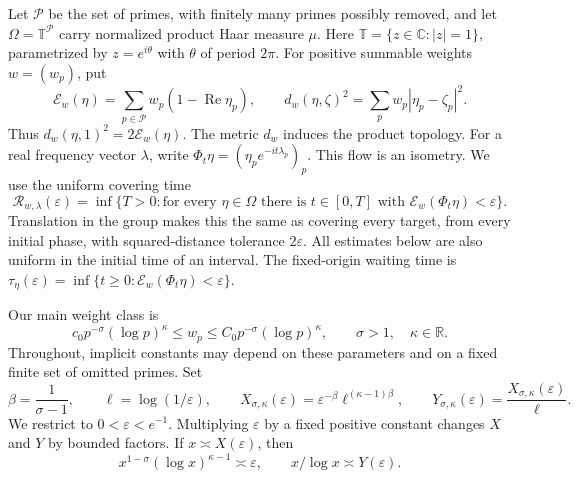 \documentclass[11pt,letterpaper]{article}
\theoremstyle{definition}
\theoremstyle{remark}
\newcommand{\T}{\mathbb T}
\newcommand{\R}{\mathbb R}
\newcommand{\C}{\mathbb C}
\newcommand{\eps}{\varepsilon}
\renewcommand{\Re}{\operatorname{Re}}
\newcommand{\1}{\mathbf 1}
\begin{document}
Let $\mathcal P$ be the set of primes, with finitely many primes possibly
removed, and let $\Omega=\T^{\mathcal P}$ carry normalized product Haar
measure $\mu$. Here $\T=\{z\in\C:|z|=1\}$, parametrized by
$z=e^{i\theta}$ with $\theta$ of period $2\pi$.
For positive summable weights $w=(w_p)$, put
\begin{equation}\label{p02:eq:energy}
 \mathcal E_w(\eta)=\sum_{p\in\mathcal P}w_p(1-\Re\eta_p),
 \qquad d_w(\eta,\zeta)^2=\sum_p w_p|\eta_p-\zeta_p|^2.
\end{equation}
Thus $d_w(\eta,1)^2=2\mathcal E_w(\eta)$. The metric $d_w$ induces
the product topology. For a real frequency vector $\lambda$, write
$\Phi_t\eta=(\eta_p e^{-it\lambda_p})_p$. This flow is an isometry.
We use the uniform covering time
\begin{equation}\label{p02:eq:covering}
 \mathcal R_{w,\lambda}(\eps)=\inf\{T>0:
 \text{for every }\eta\in\Omega\text{ there is }t\in[0,T]
 \text{ with }\mathcal E_w(\Phi_t\eta)<\eps\}.
\end{equation}
Translation in the group makes this the same as covering every target,
from every initial phase, with squared-distance tolerance $2\eps$.
All estimates below are also uniform in the initial time of an interval.
The fixed-origin waiting time is
$\tau_\eta(\eps)=\inf\{t\ge0:\mathcal E_w(\Phi_t\eta)<\eps\}$.

Our main weight class is
\begin{equation}\label{p02:eq:weights}
 c_0p^{-\sigma}(\log p)^\kappa\le w_p\le
 C_0p^{-\sigma}(\log p)^\kappa,
 \qquad \sigma>1,\quad\kappa\in\R.
\end{equation}
Throughout, implicit constants may depend on these parameters and on a
fixed finite set of omitted primes. Set
\begin{equation}\label{p02:eq:scales}
 \beta=\frac1{\sigma-1},\qquad \ell=\log(1/\eps),\qquad
 X_{\sigma,\kappa}(\eps)=\eps^{-\beta}\ell^{(\kappa-1)\beta},
 \qquad Y_{\sigma,\kappa}(\eps)=\frac{X_{\sigma,\kappa}(\eps)}{\ell}.
\end{equation}
We restrict to $0<\eps<e^{-1}$. Multiplying $\eps$ by a fixed positive
constant changes $X$ and $Y$ by bounded factors. If $x\asymp X(\eps)$,
then
\begin{equation}\label{p02:eq:cutoff-scale}
 x^{1-\sigma}(\log x)^{\kappa-1}\asymp\eps,
 \qquad x/\log x\asymp Y(\eps).
\end{equation}
\end{document}

